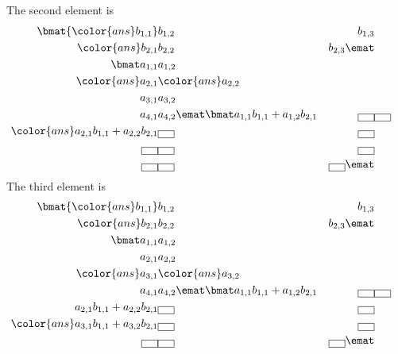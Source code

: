 The second element is
\begin{eqnarray*}
\bmat  %
{\color{ans}b_{1,1}} & b_{1,2} & b_{1,3} \\
{\color{ans}b_{2,1}} & b_{2,2} & b_{2,3}
\emat \\
\bmat
a_{1,1} & a_{1,2} \\
{\color{ans}a_{2,1}} & {\color{ans}a_{2,2}} \\
a_{3,1} & a_{3,2} \\
a_{4,1} & a_{4,2}
\emat
\bmat
a_{1,1}b_{1,1}+a_{1,2}b_{2,1} & \fbox{\hspace{8pt}} & \fbox{\hspace{8pt}} \\
{\color{ans}a_{2,1}b_{1,1}+a_{2,2}b_{2,1}} & \fbox{\hspace{8pt}} & \fbox{\hspace{8pt}} \\
\fbox{\hspace{8pt}} & \fbox{\hspace{8pt}} & \fbox{\hspace{8pt}} \\
\fbox{\hspace{8pt}} & \fbox{\hspace{8pt}} & \fbox{\hspace{8pt}}
\emat
\end{eqnarray*}
The third element is
\begin{eqnarray*}
\bmat  %
{\color{ans}b_{1,1}} & b_{1,2} & b_{1,3} \\
{\color{ans}b_{2,1}} & b_{2,2} & b_{2,3}
\emat \\
\bmat
a_{1,1} & a_{1,2} \\
a_{2,1} & a_{2,2} \\
{\color{ans}a_{3,1}} & {\color{ans}a_{3,2}} \\
a_{4,1} & a_{4,2}
\emat
\bmat
a_{1,1}b_{1,1}+a_{1,2}b_{2,1} & \fbox{\hspace{8pt}} & \fbox{\hspace{8pt}} \\
a_{2,1}b_{1,1}+a_{2,2}b_{2,1} & \fbox{\hspace{8pt}} & \fbox{\hspace{8pt}} \\
{\color{ans}a_{3,1}b_{1,1}+a_{3,2}b_{2,1}} & \fbox{\hspace{8pt}} & \fbox{\hspace{8pt}} \\
\fbox{\hspace{8pt}} & \fbox{\hspace{8pt}} & \fbox{\hspace{8pt}}
\emat
\end{eqnarray*}
